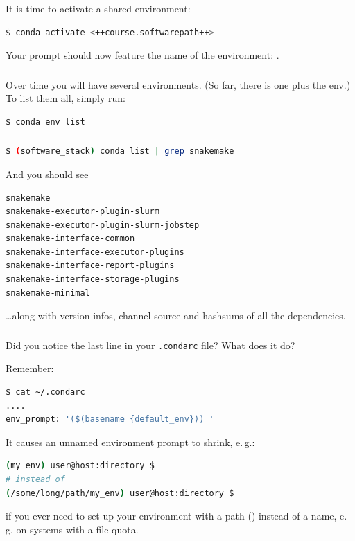 \begin{frame}[fragile]
	\frametitle{}
	It is time to activate a shared environment:
	\begin{lstlisting}[language=Bash, style=Shell]
$ conda activate <++course.softwarepath++>
	\end{lstlisting}
	Your prompt should now feature the name of the environment: .
\end{frame}

\begin{frame}[fragile]
	\frametitle{}
	Over time you will have several environments. (So far, there is one plus the  env.) To list them all, simply run:
	\begin{lstlisting}[language=Bash, style=Shell]
$ conda env list
	\end{lstlisting}
\end{frame}

\begin{frame}[fragile]
    \frametitle{}
    \begin{lstlisting}[language=Bash, style=Shell]
$ (software_stack) conda list | grep snakemake
    \end{lstlisting}
     And you should see
     \begin{lstlisting}[style=Plain]
snakemake
snakemake-executor-plugin-slurm
snakemake-executor-plugin-slurm-jobstep
snakemake-interface-common
snakemake-interface-executor-plugins
snakemake-interface-report-plugins
snakemake-interface-storage-plugins
snakemake-minimal
     \end{lstlisting}
     \ldots along with version infos, channel source and hashsums of all the dependencies.
\end{frame}

\begin{frame}[fragile]
   \frametitle{}
   \begin{question}
   	Did you notice the last line in your \texttt{.condarc} file? What does it do?
   \end{question} 
   Remember:
     \begin{lstlisting}[language=Bash, style=Shell]
$ cat ~/.condarc
....
env_prompt: '($(basename {default_env})) '
   \end{lstlisting}
   \pause
   It causes an unnamed environment prompt to shrink, e.\,g.:
   \begin{lstlisting}[language=Bash, style=Plain]
(my_env) user@host:directory $
# instead of
(/some/long/path/my_env) user@host:directory $
   \end{lstlisting}
   if you ever need to set up your environment with a path () instead of a name, e.\,g. on systems with a file quota.
\end{frame}



